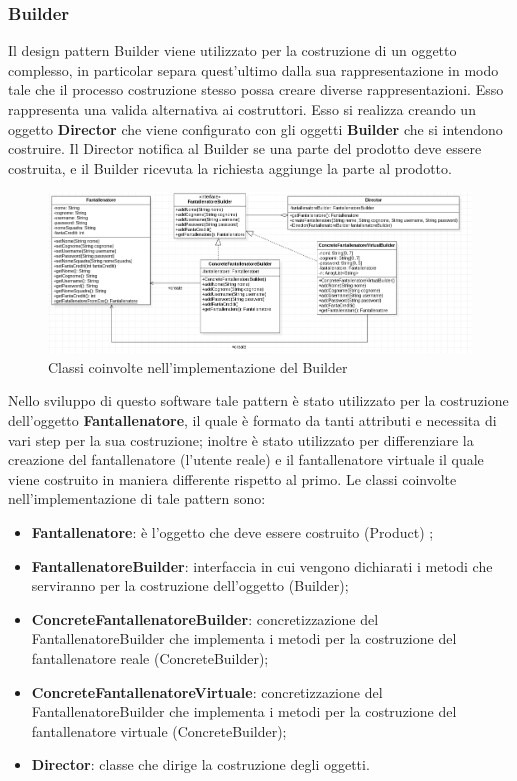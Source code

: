 \documentclass[12pt,a4paper]{article}
\begin{document}
\subsubsection{Builder}
Il design pattern Builder viene utilizzato  per la costruzione di un oggetto complesso,  in particolar separa quest'ultimo dalla sua rappresentazione in modo tale che il processo costruzione stesso possa creare diverse rappresentazioni. Esso rappresenta una valida alternativa ai costruttori. Esso si realizza creando un oggetto \textbf{Director}  che viene configurato con gli oggetti 	\textbf{Builder} che si intendono costruire. Il Director notifica al Builder se una parte del prodotto deve essere costruita, e il Builder ricevuta la richiesta aggiunge la parte al prodotto. \\
 \begin{figure}[h]
\centering
\includegraphics[width=15 cm,keepaspectratio]{Builder.png}
\caption{Classi coinvolte nell'implementazione del Builder}
\end{figure}
\newline
Nello sviluppo di questo software tale pattern è stato utilizzato per la costruzione dell'oggetto \textbf{Fantallenatore}, il quale è formato da tanti attributi e necessita di vari step per la sua costruzione; inoltre è stato utilizzato per differenziare la creazione del fantallenatore (l'utente reale) e il fantallenatore virtuale il quale viene costruito in maniera differente rispetto al primo. Le classi coinvolte nell'implementazione di tale pattern sono:
\begin{itemize}
\item \textbf{Fantallenatore}: è l'oggetto che deve essere costruito (Product) ;
\item \textbf{FantallenatoreBuilder}: interfaccia in cui vengono dichiarati  i metodi che serviranno per la costruzione dell'oggetto (Builder);
\item \textbf{ConcreteFantallenatoreBuilder}: concretizzazione del FantallenatoreBuilder che implementa i metodi per la costruzione del fantallenatore reale (ConcreteBuilder);
\item \textbf{ConcreteFantallenatoreVirtuale}: concretizzazione del FantallenatoreBuilder che implementa i metodi per la costruzione del fantallenatore virtuale (ConcreteBuilder);
\item \textbf{Director}: classe che dirige la costruzione degli oggetti.
\end{itemize}
\newpage
\end{document}
